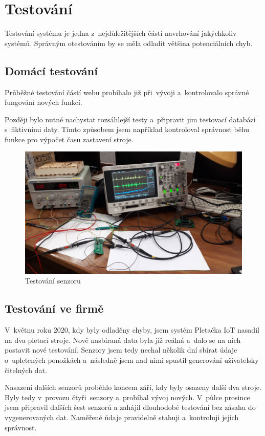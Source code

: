 \chapter{Testování}
Testování systému je jedna z~nejdůležitějších částí navrhování jakýchkoliv systémů.
Správným otestováním by se měla odladit většina potenciálních chyb.



\section{Domácí testování}
Průběžné testování částí webu probíhalo již při~vývoji a~kontrolovalo správné fungování nových funkcí.

Později bylo nutné nachystat rozsáhlejší testy a~připravit jim testovací databázi s~fiktivními daty.
Tímto způsobem jsem například kontroloval správnost běhu funkce pro výpočet času zastavení stroje.


\begin{figure}[htbp]
    \centering
    \includegraphics[width=\textwidth]{img/testovani.png}
    \caption{Testování senzoru}
    \label{fig:SenzorNaStroji}
\end{figure}

\section{Testování ve firmě}
V~květnu roku 2020, kdy byly odladěny chyby, jsem systém Pletačka IoT nasadil na dva pletací stroje.
Nově nasbíraná data byla již reálná a~dalo se na nich postavit nové testování.
Senzory jsem tedy nechal několik dní sbírat údaje o~upletených ponožkách a~následně jsem nad nimi spustil generování uživatelsky čitelných dat.

Nasazení dalších senzorů proběhlo koncem září, kdy byly osazeny další dva stroje. Byly tedy v provozu čtyři senzory a probíhal vývoj nových.
V půlce prosince jsem připravil dalších šest senzorů a zahájil dlouhodobé testování bez zásahu do vygenerovaných dat. Naměřené údaje pravidelně stahuji a kontroluji jejich správnost.


